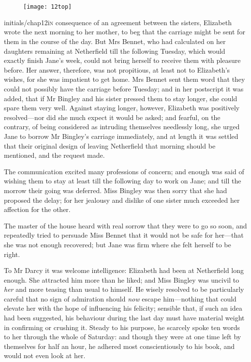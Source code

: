 \chapter[Chapter \thechapter]{}
\begin{figure}[t!]
\centering
\texttt{[image: 12top]}
\end{figure}

\vspace{-0.5cm}
\lettrine[lines=8,loversize=.3,image=true]{initials/chap12i}{n}  consequence of an agreement between the sisters, Elizabeth wrote the next morning to her mother, to beg that the carriage might be sent for them in the course of the day. But Mrs Bennet, who had calculated on her daughters remaining at Netherfield till the following Tuesday, which would exactly finish Jane's week, could not bring herself to receive them with pleasure before. Her answer, therefore, was not propitious, at least not to Elizabeth's wishes, for she was impatient to get home. Mrs Bennet sent them word that they could not possibly have the carriage before Tuesday; and in her postscript it was added, that if Mr Bingley and his sister pressed them to stay longer, she could spare them very well. Against staying longer, however, Elizabeth was positively resolved—nor did she much expect it would be asked; and fearful, on the contrary, of being considered as intruding themselves needlessly long, she urged Jane to borrow Mr Bingley's carriage immediately, and at length it was settled that their original design of leaving Netherfield that morning should be mentioned, and the request made.

The communication excited many professions of concern; and enough was said of wishing them to stay at least till the following day to work on Jane; and till the morrow their going was deferred. Miss Bingley was then sorry that she had proposed the delay; for her jealousy and dislike of one sister much exceeded her affection for the other.

The master of the house heard with real sorrow that they were to go so soon, and repeatedly tried to persuade Miss Bennet that it would not be safe for her—that she was not enough recovered; but Jane was firm where she felt herself to be right.

To Mr Darcy it was welcome intelligence: Elizabeth had been at Netherfield long enough. She attracted him more than he liked; and Miss Bingley was uncivil to \textit{her} and more teasing than usual to himself. He wisely resolved to be particularly careful that no sign of admiration should \textit{now} escape him—nothing that could elevate her with the hope of influencing his felicity; sensible that, if such an idea had been suggested, his behaviour during the last day must have material weight in confirming or crushing it. Steady to his purpose, he scarcely spoke ten words to her through the whole of Saturday: and though they were at one time left by themselves for half an hour, he adhered most conscientiously to his book, and would not even look at her.

